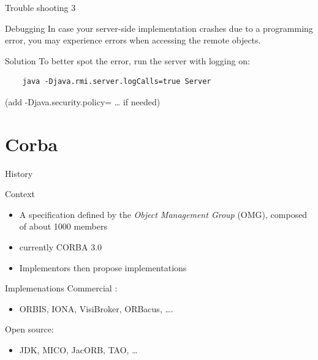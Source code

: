 \documentclass[bigger,hyperref={colorlinks=true, urlcolor=red, plainpages=false, pdfpagelabels, bookmarksnumbered}]{beamer}
\begin{document}
\begin{frame}[fragile,label=sec-3-15]{Trouble shooting 3}
 \begin{block}{Debugging}
In case your server-side implementation crashes due to a programming error,
you may experience errors when accessing the remote objects.
\end{block}

\begin{block}{Solution}
To better spot the error, run the server with logging on:
\lstset{language=java,label= ,caption= ,numbers=none}
\begin{lstlisting}
    java -Djava.rmi.server.logCalls=true Server
\end{lstlisting}
(add -Djava.security.policy= \ldots{} if needed) 
\end{block}
\end{frame}
\section{Corba}
\label{sec-4}
\begin{frame}[label=sec-4-1]{History}
\begin{block}{Context}
\begin{itemize}
\item A specification defined by the \emph{Object Management Group} (OMG), 
composed of about 1000 members
\item currently CORBA 3.0
\item Implementors then propose implementations
\end{itemize}
\end{block}

\begin{block}{Implemenations}
Commercial :
\begin{itemize}
\item ORBIS, IONA, VisiBroker, ORBacus, \ldots{}.
\end{itemize}
Open source:
\begin{itemize}
\item JDK, MICO, JacORB, TAO, \ldots{}
\end{itemize}
\end{block}
\end{frame}
\end{document}
